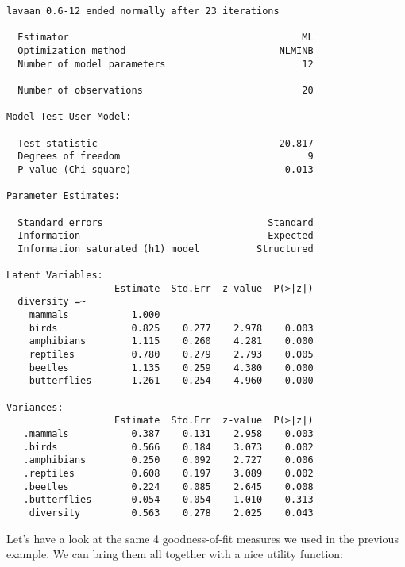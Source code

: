 \documentclass[
  letterpaper,
  DIV=11,
  numbers=noendperiod]{scrreprt}
\begin{document}
\begin{verbatim}
lavaan 0.6-12 ended normally after 23 iterations

  Estimator                                         ML
  Optimization method                           NLMINB
  Number of model parameters                        12

  Number of observations                            20

Model Test User Model:
                                                      
  Test statistic                                20.817
  Degrees of freedom                                 9
  P-value (Chi-square)                           0.013

Parameter Estimates:

  Standard errors                             Standard
  Information                                 Expected
  Information saturated (h1) model          Structured

Latent Variables:
                   Estimate  Std.Err  z-value  P(>|z|)
  diversity =~                                        
    mammals           1.000                           
    birds             0.825    0.277    2.978    0.003
    amphibians        1.115    0.260    4.281    0.000
    reptiles          0.780    0.279    2.793    0.005
    beetles           1.135    0.259    4.380    0.000
    butterflies       1.261    0.254    4.960    0.000

Variances:
                   Estimate  Std.Err  z-value  P(>|z|)
   .mammals           0.387    0.131    2.958    0.003
   .birds             0.566    0.184    3.073    0.002
   .amphibians        0.250    0.092    2.727    0.006
   .reptiles          0.608    0.197    3.089    0.002
   .beetles           0.224    0.085    2.645    0.008
   .butterflies       0.054    0.054    1.010    0.313
    diversity         0.563    0.278    2.025    0.043
\end{verbatim}

Let's have a look at the same 4 goodness-of-fit measures we used in the
previous example. We can bring them all together with a nice utility
function:
\end{document}
